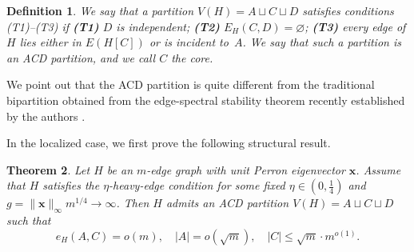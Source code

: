 \documentclass[10pt,a4paper]{amsart}
\newtheorem{theorem}{Theorem}[section]
\newtheorem{definition}[theorem]{Definition}
\begin{document}
\begin{definition} \label{def:ACD-partition} 
We say that a partition $V(H)=A\sqcup C\sqcup D$ satisfies conditions (T1)--(T3) if \textbf{(T1)} $D$ is independent;
\textbf{(T2)} $E_H(C,D)=\varnothing$;
\textbf{(T3)} every edge of $H$ lies either in $E(H[C])$ or is incident to~$A$. 
We say that such a partition is an \emph{ACD partition}, and we call \(C\) the \emph{core}. 
\end{definition}

We point out that the ACD partition is quite different from the traditional bipartition obtained from the edge-spectral stability theorem recently established by the authors \cite{LiLiuZhang2025EdgeSpectralESS}. 

In the localized case, we first prove the following structural result. 

\begin{theorem} 
\label{thm:localized-structure}
Let $H$ be an $m$-edge graph with unit Perron eigenvector $\bm{x}$. 
Assume that $H$ satisfies the $\eta$-heavy-edge condition for some fixed $\eta\in(0,\tfrac14)$ and $g=\|\bm{x} \|_\infty m^{1/4} \to\infty$. 
Then $H$ admits an ACD partition $V(H)=A\sqcup C\sqcup D$ such that 
\[
 e_H(A,C)=o(m), \quad 
|A|=o(\sqrt{m}), \quad 
|C| \le \sqrt{m}\cdot m^{o(1)}. 
\] 
\end{theorem}
\end{document}
